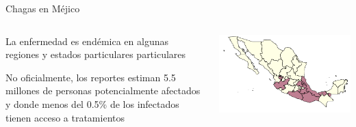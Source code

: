 \documentclass{beamer}
\begin{document}
\begin{frame}{Chagas en Méjico}
	\begin{columns}
		\begin{column}{0.3\textwidth}

			La enfermedad es endémica en algunas regiones y estados particulares particulares


			\medskip No oficialmente, los reportes estiman 5.5 millones de personas potencialmente afectados y donde menos del 0.5\% de los infectados tienen acceso a tratamientos


		\end{column}
		\begin{column}{0.7\textwidth}
			\includegraphics[width=\textwidth]{slides/Ambientes_Gran_Chaco-Mexico_original.png}
		\end{column}
	\end{columns}
\end{frame}
\end{document}
